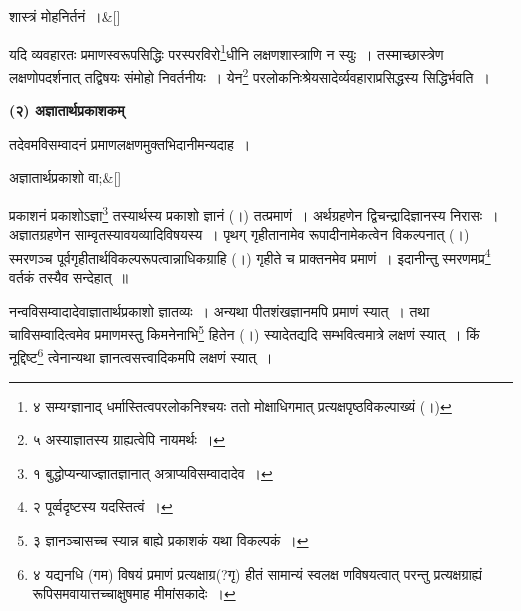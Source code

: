 \documentclass[article,12pt,a4paper]{memoir}
\begin{document}
	  \bigskip
	  \begingroup
	
	    \large
	  
	    
	    \stanza[\smallbreak]
	\label{pv.1.7b}शास्त्रं मोहनिर्तनं ।\&[\smallbreak]


	
	  \endgroup
	

	  \pstart यदि व्यवहारतः प्रमाणस्वरूपसिद्धिः परस्परविरो\footnote{\label{pvv.7-4}  ४ सम्यग्ज्ञानाद् धर्मास्तित्वपरलोकनिश्चयः ततो मोक्षाधिगमात् प्रत्यक्षपृष्ठविकल्पाख्यं (।)}धीनि लक्षणशास्त्राणि न स्युः । तस्माच्छास्त्रेण लक्षणोपदर्शनात् तद्विषयः संमोहो निवर्तनीयः । येन\footnote{\label{pvv.7-5}  ५ अस्याज्ञातस्य ग्राह्यत्वेपि नायमर्थः ।} परलोकनिःश्रेयसादेर्व्यवहाराप्रसिद्धस्य सिद्धिर्भवति ।
	\pend
      

	  \begin{center}%
	\textbf{(२) अज्ञातार्थप्रकाशकम्}
	\end{center}
	

	  \pstart तदेवमविसम्वादनं प्रमाणलक्षणमुक्तभिदानीमन्यदाह ।
	\pend
      \leavevmode{}
	  \bigskip
	  \begingroup
	
	    \large
	  
	    
	    \stanza[\smallbreak]
	\label{pv.1.7c}अज्ञातार्थप्रकाशो वा;\&[\smallbreak]


	
	  \endgroup
	

	  \pstart प्रकाशनं प्रकाशोऽज्ञा\footnote{\label{pvv.8-1}  १ बुद्धोप्यन्याज्ज्ञातज्ञानात् अत्राप्यविसम्वादादेव ।} तस्यार्थस्य प्रकाशो ज्ञानं (।) तत्प्रमाणं । अर्थग्रहणेन द्विचन्द्रादिज्ञानस्य निरासः । अज्ञातग्रहणेन साम्वृतस्यावयव्यादिविषयस्य । पृथग् गृहीतानामेव रूपादीनामेकत्वेन विकल्पनात् (।) स्मरणञ्च पूर्वगृहीतार्थविकल्परूपत्वान्नाधिकग्राहि (।) गृहीते च प्राक्तनमेव प्रमाणं । इदानीन्तु स्मरणमप्र\footnote{\label{pvv.8-2}  २ पूर्व्वदृष्टस्य यदस्तित्वं ।} वर्तकं तस्यैव सन्देहात् ॥
	\pend
      

	  \pstart नन्वविसम्वादादेवाज्ञातार्थप्रकाशो ज्ञातव्यः । अन्यथा पीतशंखज्ञानमपि प्रमाणं स्यात् । तथा चाविसम्वादित्वमेव प्रमाणमस्तु किमनेनाभि\footnote{\label{pvv.8-3}  ३ ज्ञानञ्चासच्च स्यान्न बाह्ये प्रकाशकं यथा विकल्पकं ।} हितेन (।) स्यादेतद्यदि सम्भवित्वमात्रे लक्षणं स्यात् । किं नूद्दिष्ट\footnote{\label{pvv.8-4}  ४ यद्यनधि (गम) विषयं प्रमाणं प्रत्यक्षाग्र(?गृ) हीतं सामान्यं स्वलक्ष णविषयत्वात् परन्तु प्रत्यक्षग्राह्यं रूपिसमवायात्तच्चाक्षुषमाह मीमांसकादेः ।} त्वेनान्यथा ज्ञानत्वसत्त्वादिकमपि लक्षणं स्यात् ।
	\pend
      
\end{document}
